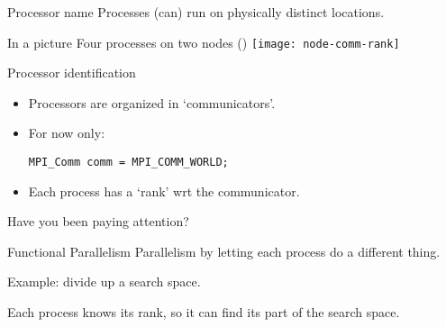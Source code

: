 \begin{numberedframe}{Processor name}
  Processes (can) run on physically distinct locations.

\end{numberedframe}


\begin{exerciseframe}
  
\end{exerciseframe}

\begin{numberedframe}{In a picture}
  Four processes on two nodes ()
  \texttt{[image: node-comm-rank]}
\end{numberedframe}

\begin{numberedframe}{Processor identification}
  \begin{itemize}
  \item Processors are organized in `communicators'.
  \item For now only:
\begin{lstlisting}
MPI_Comm comm = MPI_COMM_WORLD;
\end{lstlisting}
  \item Each process has a `rank' wrt the communicator.
  \end{itemize}
\end{numberedframe}


\begin{numberedframe}{Have you been paying attention?}
  
\end{numberedframe}

\begin{exerciseframe}[commrank]
  
\end{exerciseframe}

\begin{exerciseframe}[commrank]
  
\end{exerciseframe}


\begin{numberedframe}{Functional Parallelism}
  Parallelism by letting each process do a different thing.

  Example: divide up a search space.

  Each process knows its rank, so it can find its part of the search space.
\end{numberedframe}

\begin{exerciseframe}[prime]
  
\end{exerciseframe}

\begin{exerciseframe}
  
\end{exerciseframe}

\endinput

\begin{numberedframe}\frametitle{}
\begin{lstlisting}
  
\end{lstlisting}
\end{numberedframe}

